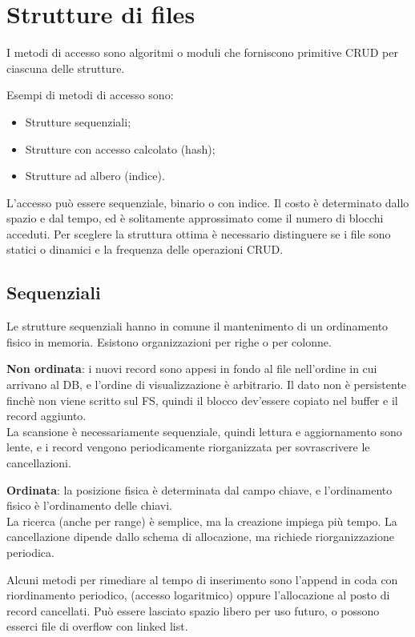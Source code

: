 \section{Strutture di files}
I metodi di accesso sono algoritmi o moduli che forniscono primitive CRUD per ciascuna delle strutture.

Esempi di metodi di accesso sono: 
\begin{itemize}
	\item Strutture sequenziali;
	\item Strutture con accesso calcolato (hash);
	\item Strutture ad albero (indice).
\end{itemize}

L'accesso può essere sequenziale, binario o con indice. Il costo è determinato dallo spazio e dal tempo, ed è solitamente approssimato come il numero di blocchi acceduti. Per sceglere la struttura ottima è necessario distinguere se i file sono statici o dinamici e la frequenza delle operazioni CRUD.

\subsection{Sequenziali}
Le strutture sequenziali hanno in comune il mantenimento di un ordinamento fisico in memoria. Esistono organizzazioni per righe o per colonne.

\textbf{Non ordinata}: i nuovi record sono appesi in fondo al file nell'ordine in cui arrivano al DB, e l'ordine di visualizzazione è arbitrario. Il dato non è persistente finchè non viene scritto sul FS, quindi il blocco dev'essere copiato nel buffer e il record aggiunto. \\
La scansione è necessariamente sequenziale, quindi lettura e aggiornamento sono lente, e i record vengono periodicamente riorganizzata per sovrascrivere le cancellazioni.

\textbf{Ordinata}: la posizione fisica è determinata dal campo chiave, e l'ordinamento fisico è l'ordinamento delle chiavi. \\
La ricerca (anche per range) è semplice, ma la creazione impiega più tempo. La cancellazione dipende dallo schema di allocazione, ma richiede riorganizzazione periodica. 

Alcuni metodi per rimediare al tempo di inserimento sono l'append in coda con riordinamento periodico, (accesso logaritmico) oppure l'allocazione al posto di record cancellati. Può essere lasciato spazio libero per uso futuro, o possono esserci file di overflow con linked list.

